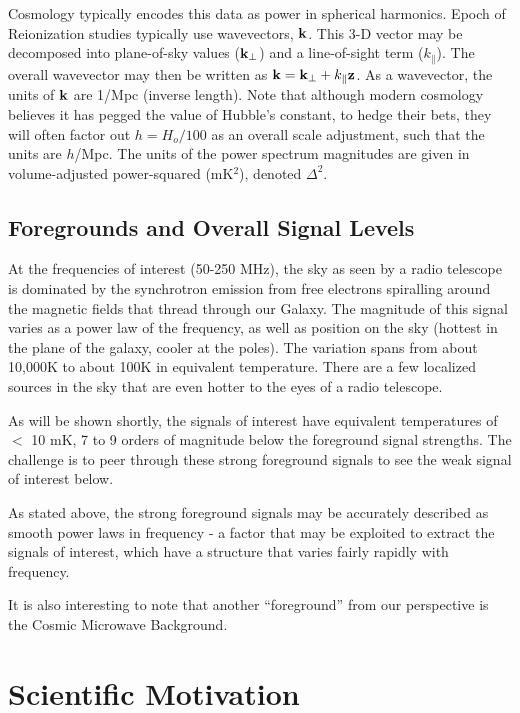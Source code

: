 \documentclass[ars]{/Users/daviddeboer1/Documents/Papers/Copernicus_LaTeX_Package_v_2_7/copernicus}
\def\kperp{k_{\bot}}
\def\kpar{k_{\|}}
\def\kperp{k_{\bot}}
\def\kpar{k_{\|}}
\def\k{{\bf k}}
\begin{document}
Cosmology typically encodes this data as power in spherical harmonics.  Epoch of
Reionization studies typically use wavevectors, $\k$.  This 3-D vector may be decomposed
into plane-of-sky values (${\bf \kperp}$) and a line-of-sight term (${\kpar}$).  The overall
wavevector may then be written as $\k = {\bf \kperp} + \kpar{\bf z}$.  As a wavevector,
the units of $\k$ are 1/Mpc (inverse length).  Note that although modern cosmology believes
it has pegged the value of Hubble's constant, to hedge their bets, they will often factor out
$h=H_o/100$ as an overall scale adjustment, such that the units are $h$/Mpc.  The units
of the power spectrum magnitudes are given in volume-adjusted power-squared (mK$^2$), denoted
$\Delta ^2$.

\subsection{Foregrounds and Overall Signal Levels}
\label{sec:foregrounds}
At the frequencies of interest (50-250 MHz), the sky as seen by a radio telescope is dominated 
by the synchrotron emission from free electrons spiralling around the magnetic fields that thread
through our Galaxy.  The magnitude of this signal varies as a power law of the frequency, as well
as position on the sky (hottest in the plane of the galaxy, cooler at the poles).  The variation spans
from about 10,000K to about 100K in equivalent temperature.  There are a few localized sources
in the sky that are even hotter to the eyes of a radio telescope.

As will be shown shortly, the signals of interest have equivalent temperatures of $<$ 10 mK, 7 to 9 
orders of magnitude below the foreground signal strengths.  The challenge is to peer through these
strong foreground signals to see the weak signal of interest below.

As stated above, the strong foreground signals may be accurately described as smooth power laws in 
frequency - a factor that may be exploited to extract the signals of interest, which have a structure
that varies fairly rapidly with frequency.

It is also interesting to note that another ``foreground'' from our perspective is the Cosmic Microwave Background.

\section{Scientific Motivation}
\label{sec:science}
\end{document}
